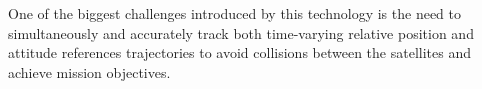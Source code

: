 \documentclass[letterpaper, preprint, paper,11pt]{AAS}	%
\begin{document}
One of the biggest challenges introduced
by this technology is the need to simultaneously and accurately
track both time-varying relative position and attitude references
trajectories to avoid collisions between the satellites and achieve mission objectives.





\end{document}
